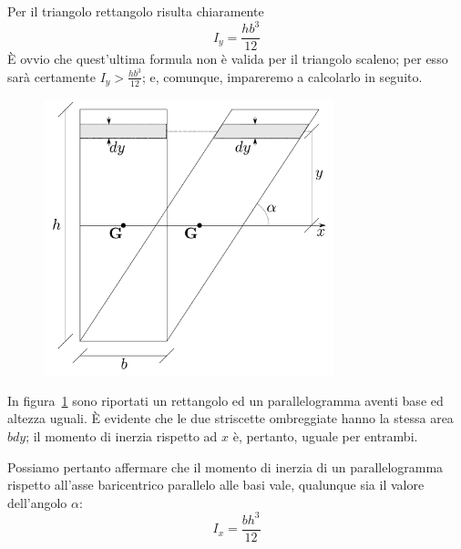 \noindent Per il triangolo rettangolo risulta chiaramente 
\begin{equation*}
I_y = \frac{hb^{3}}{12}
\end{equation*}
È ovvio che quest'ultima formula non è valida per il triangolo scaleno; per esso sarà certamente $I_y > \frac{hb^{3}}{12}$; e, comunque, impareremo a calcolarlo in seguito. 
\renewcommand{\thefigure}{2~-~4}
\begin{figure}[ht]
\centering
\includegraphics[width=0.75\textwidth]{Immagini/Parte_2/Figura2_4/Figura2_4.pdf}
\caption{}
\label{figura2-4}
\end{figure}
\noindent In figura~\ref{figura2-4} sono riportati un rettangolo ed un parallelogramma aventi base ed altezza uguali. È evidente che le due striscette ombreggiate hanno la stessa area $bdy$; il momento di inerzia rispetto ad $x$ è, pertanto, uguale per entrambi. 

\noindent Possiamo pertanto affermare che il momento di inerzia di un parallelogramma rispetto all'asse baricentrico parallelo alle basi vale, qualunque sia il valore dell'angolo $\alpha$:
\begin{equation*}
I_x = \frac{bh^{3}}{12}
\end{equation*}
